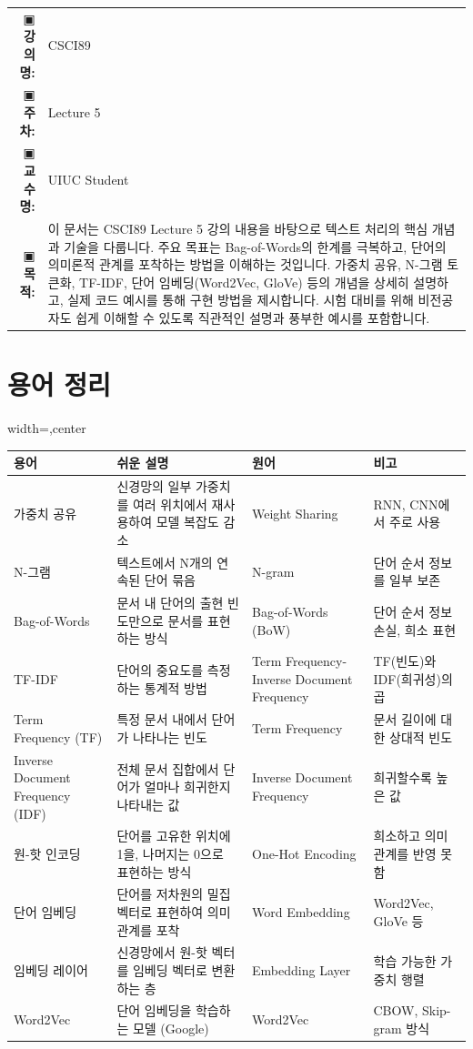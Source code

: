 \documentclass[11pt,a4paper]{article}
\makeatletter
\theoremstyle{definition}
\newcommand{\metainfo}[4]{
\begin{tcolorbox}[
    colback=lightpurple,
    colframe=darkpurple,
    boxrule=1pt,
    arc=2mm,
    left=10pt,
    right=10pt,
    top=8pt,
    bottom=8pt
]
\begin{tabular}{@{}rl@{}}
▣ \textbf{강의명:} & #1 \\[0.3em]
▣ \textbf{주차:} & #2 \\[0.3em]
▣ \textbf{교수명:} & #3 \\[0.3em]
▣ \textbf{목적:} & \begin{minipage}[t]{0.75\textwidth}#4\end{minipage}
\end{tabular}
\end{tcolorbox}
}
\makeatother
\begin{document}
\thispagestyle{firstpage}

\metainfo{CSCI89}{Lecture 5}{UIUC Student}{이 문서는 CSCI89 Lecture 5 강의 내용을 바탕으로 텍스트 처리의 핵심 개념과 기술을 다룹니다.
주요 목표는 Bag-of-Words의 한계를 극복하고, 단어의 의미론적 관계를 포착하는 방법을 이해하는 것입니다.
가중치 공유, N-그램 토큰화, TF-IDF, 단어 임베딩(Word2Vec, GloVe) 등의 개념을 상세히 설명하고,
실제 코드 예시를 통해 구현 방법을 제시합니다.
시험 대비를 위해 비전공자도 쉽게 이해할 수 있도록 직관적인 설명과 풍부한 예시를 포함합니다.}

\tableofcontents

\newpage

\section{용어 정리}
\begin{adjustbox}{width=\textwidth,center}
\begin{tabular}{llll}
\toprule
\textbf{용어} & \textbf{쉬운 설명} & \textbf{원어} & \textbf{비고} \\
\midrule
가중치 공유 & 신경망의 일부 가중치를 여러 위치에서 재사용하여 모델 복잡도 감소 & Weight Sharing & RNN, CNN에서 주로 사용 \\
N-그램 & 텍스트에서 N개의 연속된 단어 묶음 & N-gram & 단어 순서 정보를 일부 보존 \\
Bag-of-Words & 문서 내 단어의 출현 빈도만으로 문서를 표현하는 방식 & Bag-of-Words (BoW) & 단어 순서 정보 손실, 희소 표현 \\
TF-IDF & 단어의 중요도를 측정하는 통계적 방법 & Term Frequency-Inverse Document Frequency & TF(빈도)와 IDF(희귀성)의 곱 \\
Term Frequency (TF) & 특정 문서 내에서 단어가 나타나는 빈도 & Term Frequency & 문서 길이에 대한 상대적 빈도 \\
Inverse Document Frequency (IDF) & 전체 문서 집합에서 단어가 얼마나 희귀한지 나타내는 값 & Inverse Document Frequency & 희귀할수록 높은 값 \\
원-핫 인코딩 & 단어를 고유한 위치에 1을, 나머지는 0으로 표현하는 방식 & One-Hot Encoding & 희소하고 의미 관계를 반영 못함 \\
단어 임베딩 & 단어를 저차원의 밀집 벡터로 표현하여 의미 관계를 포착 & Word Embedding & Word2Vec, GloVe 등 \\
임베딩 레이어 & 신경망에서 원-핫 벡터를 임베딩 벡터로 변환하는 층 & Embedding Layer & 학습 가능한 가중치 행렬 \\
Word2Vec & 단어 임베딩을 학습하는 모델 (Google) & Word2Vec & CBOW, Skip-gram 방식 \\

\end{tabular}
\end{adjustbox}
\end{document}
